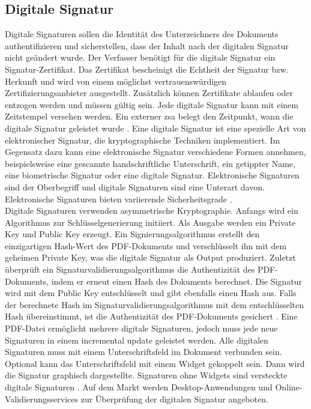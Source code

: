 \subsection{Digitale Signatur}
Digitale Signaturen sollen die Identität des Unterzeichners des Dokuments authentifizieren und sicherstellen, dass der Inhalt nach der digitalen Signatur nicht geändert wurde. Der Verfasser benötigt für die digitale Signatur ein Signatur-Zertifikat. Das Zertifikat bescheinigt die Echtheit der Signatur bzw. Herkunft und wird von einem möglichst vertrauenswürdigen Zertifizierungsanbieter ausgestellt. Zusätzlich können Zertifikate ablaufen oder entzogen werden und müssen gültig sein. Jede digitale Signatur kann mit einem Zeitstempel versehen werden. Ein externer \gls{zsa} belegt den Zeitpunkt, wann die digitale Signatur geleistet wurde \cite{softx}. Eine digitale Signatur ist eine spezielle Art von elektronischer Signatur, die kryptographische Techniken implementiert. Im Gegensatz dazu kann eine elektronische Signatur verschiedene Formen annehmen, beispielsweise eine gescannte handschriftliche Unterschrift, ein getippter Name, eine biometrische Signatur oder eine digitale Signatur. Elektronische Signaturen sind der Oberbegriff und digitale Signaturen sind eine Unterart davon. Elektronische Signaturen bieten variierende Sicherheitsgrade \cite{adobe-pdf-pades}. \\
Digitale Signaturen verwenden asymmetrische Kryptographie. Anfangs wird ein Algorithmus zur Schlüsselgenerierung initiiert. Als Ausgabe werden ein Private Key und Public Key erzeugt. Ein Signierungsalgorithmus erstellt den einzigartigen Hash-Wert des PDF-Dokuments und verschlüsselt ihn mit dem geheimen Private Key, was die digitale Signatur als Output produziert. Zuletzt überprüft ein Signaturvalidierungsalgorithmus die Authentizität des PDF-Dokuments, indem er erneut einen Hash des Dokuments berechnet. Die Signatur wird mit dem Public Key entschlüsselt und gibt ebenfalls einen Hash aus. Falls der berechnete Hash im Signaturvalidierungsalgorithmus mit dem entschlüsselten Hash übereinstimmt, ist die Authentizität des PDF-Dokuments gesichert \cite{signature}. Eine PDF-Datei ermöglicht mehrere digitale Signaturen, jedoch muss jede neue Signaturen in einem incremental update geleistet werden. Alle digitalen Signaturen muss mit einem Unterschriftsfeld im Dokument verbunden sein. Optional kann das Unterschriftsfeld mit einem Widget gekoppelt sein. Dann wird die Signatur graphisch dargestellte. Signaturen ohne Widgets sind versteckte digitale Signaturen \cite{softx}. Auf dem Markt werden Desktop-Anwendungen und Online-Validierungsservices zur Überprüfung der digitalen Signatur angeboten.


